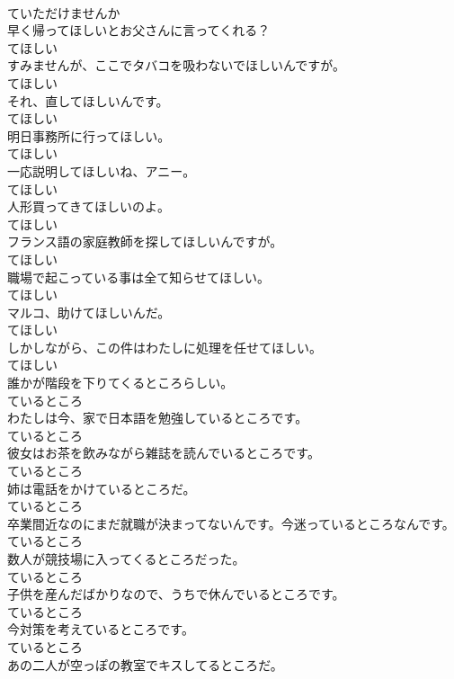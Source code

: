 \documentclass[8pt]{extreport}
\begin{document}
\begin{CJK}{UTF8}{min}
\\	ていただけませんか
\\	早く帰ってほしいとお父さんに言ってくれる？	
\\	てほしい
\\	すみませんが、ここでタバコを吸わないでほしいんですが。	
\\	てほしい
\\	それ、直してほしいんです。	
\\	てほしい
\\	明日事務所に行ってほしい。	
\\	てほしい
\\	一応説明してほしいね、アニー。	
\\	てほしい
\\	人形買ってきてほしいのよ。	
\\	てほしい
\\	フランス語の家庭教師を探してほしいんですが。	
\\	てほしい
\\	職場で起こっている事は全て知らせてほしい。	
\\	てほしい
\\	マルコ、助けてほしいんだ。	
\\	てほしい
\\	しかしながら、この件はわたしに処理を任せてほしい。	
\\	てほしい
\\	誰かが階段を下りてくるところらしい。	
\\	ているところ
\\	わたしは今、家で日本語を勉強しているところです。	
\\	ているところ
\\	彼女はお茶を飲みながら雑誌を読んでいるところです。	
\\	ているところ
\\	姉は電話をかけているところだ。	
\\	ているところ
\\	卒業間近なのにまだ就職が決まってないんです。今迷っているところなんです。	
\\	ているところ
\\	数人が競技場に入ってくるところだった。	
\\	ているところ
\\	子供を産んだばかりなので、うちで休んでいるところです。	
\\	ているところ
\\	今対策を考えているところです。	
\\	ているところ
\\	あの二人が空っぽの教室でキスしてるところだ。	

\end{CJK}
\end{document}
